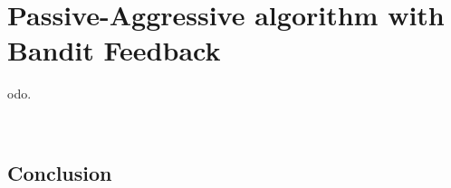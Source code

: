 %
%
\let\textcircled=\pgftextcircled
\chapter{Passive-Aggressive algorithm with Bandit Feedback}
\label{chap:BPA}

 odo.


\
\
\
\
\
\










\section{Conclusion}